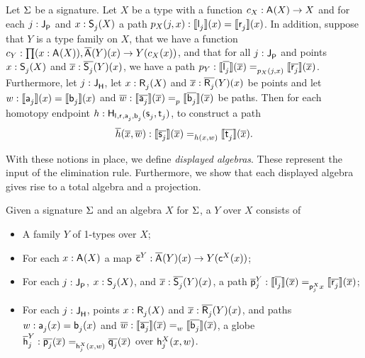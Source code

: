 \begin{problem}
\label{prob:homot_dact}
Let $\sign$ be a signature.
Let $X$ be a type with a function $c_X : \polyAct{\pointconstr}{X} \rightarrow X$
and for each $j : \pathlabel$ and $x : \polyAct{\patharg_j}{X}$ a path $p_X(j, x) : \semE{\pathleft_j}(x) = \semE{\pathright_j}(x)$.
In addition, suppose that $Y$ is a type family on $X$,
that we have a function $c_Y : \depprod{(x : \polyAct{\pointconstr}{X})}{\polyDact{\pointconstr}{Y}(x) \rightarrow Y(c_X(x))}$,
and that for all $j  : \pathlabel$ and points $x : \polyAct{\patharg_j}{X}$ and $\xx : \polyDact{\patharg_j}{Y}(x)$,
we have a path $p_Y : \pathover{p_X(j, x)}{\pathendpointDact{\pathleft_j}{\xx}}{\pathendpointDact{\pathright_j}{\xx}}$.
Furthermore, let $j : \homotlabel$, let $x : \homotpointarg_j(X)$ and $\xx : \polyDact{\homotpointarg_j}{Y}(x)$ be points
and let $w : \semE{\pathargleft_j}(x) = \semE{\pathargright_j}(x)$
and $\disp{w} : \pathover{p}{\pathendpointDact{\pathargleft_j}{\xx}}{\pathendpointDact{\pathargright_j}{\xx}}$
be paths.
Then for each homotopy endpoint $h : \homotendpoint{\pathleft}{\pathright}{\pathargleft_j}{\pathargright_j}{\homotpathleft_j}{\homotpathright_j}$, 
to construct a path
\[
\homotendpointDact{h}{\xx, \disp{w}} : \pathover{\homotendpointAct{h}{x, w}}{\pathendpointDact{\homotpathleft_j}{\xx}}{\pathendpointDact{\homotpathright_j}{\xx}}.
\]
\end{problem}

With these notions in place, we define \emph{displayed algebras}.
These represent the input of the elimination rule.
Furthermore, we show that each displayed algebra gives rise to a total algebra and a projection.

\begin{definition}\label{def:disp_alg}
Given a signature $\sign$ and an algebra $X$ for $\sign$,
a  $Y$ over $X$ consists of
\begin{itemize}
	\item A family $Y$ of 1-types over $X$;
	\item For each $x : \polyAct{\pointconstr}{X}$ a map $\DispAlgPoint{Y} : \polyDact{\pointconstr}{Y}(x) \rightarrow Y(\AlgPoint{X}(x))$;
	\item For each $j : \pathlabel$, $x : \polyAct{\patharg_j}{X}$, and $\pover{x} : \polyDact{\patharg_j}{Y}(x)$, a path
	$
	\DispAlgPath{Y}{j} : \pathover{\AlgPath{X}{j}{x}}{\pathendpointDact{\pathleft_j}{\pover{x}}}{\pathendpointDact{\pathright_j}{\pover{x}}}
	$;
	\item For each $j : \homotlabel$, points $x : \polyAct{\homotpointarg_j}{X}$ and $\pover{x} : \polyDact{\homotpointarg_j}{Y}(x)$,
	and paths $w : \pathargleft_j(x) = \pathargright_j(x)$ and $\pover{w} : \pathover{w}{\pathendpointDact{\pathargleft_j}{\pover{x}}}{\pathendpointDact{\pathargright_j}{\pover{x}}}$,
	a globe
	$
	\DispAlgHomot{Y}{j} : \globeover{\AlgHomot{X}{j}{(x, w)}}{\homotendpointDact{\homotleft_j}{\xx}}{\homotendpointDact{\homotright_j}{\xx}}
	$
	over $\AlgHomot{X}{j}{(x, w)}$.
\end{itemize}
\end{definition}

